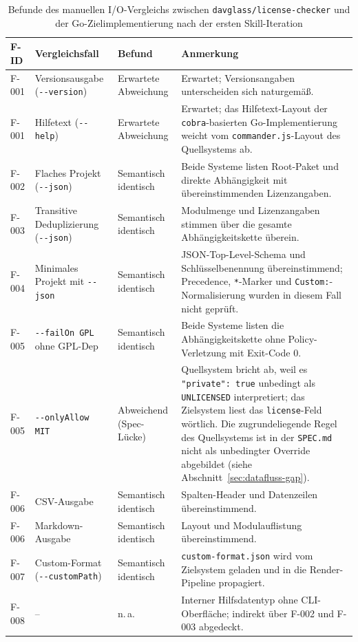\begin{table}[H]
\centering
\begin{small}
\begin{tabular}{|p{1.3cm}|p{3.5cm}|p{2.6cm}|p{5.5cm}|}
\hline
\textbf{F-ID} & \textbf{Vergleichsfall} & \textbf{Befund} & \textbf{Anmerkung} \\
\hline
F-001 & Versionsausgabe (\texttt{-{}-version}) & Erwartete Abweichung & Erwartet; Versionsangaben unterscheiden sich naturgemäß. \\
\hline
F-001 & Hilfetext (\texttt{-{}-help}) & Erwartete Abweichung & Erwartet; das Hilfetext-Layout der \texttt{cobra}-basierten Go-Implementierung weicht vom \texttt{commander.js}-Layout des Quellsystems ab. \\
\hline
F-002 & Flaches Projekt (\texttt{-{}-json}) & Semantisch identisch & Beide Systeme listen Root-Paket und direkte Abhängigkeit mit übereinstimmenden Lizenzangaben. \\
\hline
F-003 & Transitive Deduplizierung (\texttt{-{}-json}) & Semantisch identisch & Modulmenge und Lizenzangaben stimmen über die gesamte Abhängigkeitskette überein. \\
\hline
F-004 & Minimales Projekt mit \texttt{-{}-json} & Semantisch identisch & JSON-Top-Level-Schema und Schlüsselbenennung übereinstimmend; Precedence, \texttt{*}-Marker und \texttt{Custom:}-Normalisierung wurden in diesem Fall nicht geprüft. \\
\hline
F-005 & \texttt{-{}-failOn GPL} ohne GPL-Dep & Semantisch identisch & Beide Systeme listen die Abhängigkeitskette ohne Policy-Verletzung mit Exit-Code $0$. \\
\hline
F-005 & \texttt{-{}-onlyAllow MIT} & Abweichend (Spec-Lücke) & Quellsystem bricht ab, weil es \texttt{"private": true} unbedingt als \texttt{UNLICENSED} interpretiert; das Zielsystem liest das \texttt{license}-Feld wörtlich. Die zugrundeliegende Regel des Quellsystems ist in der \texttt{SPEC.md} nicht als unbedingter Override abgebildet (siehe Abschnitt~\ref{sec:datafluss-gap}). \\
\hline
F-006 & CSV-Ausgabe & Semantisch identisch & Spalten-Header und Datenzeilen übereinstimmend. \\
\hline
F-006 & Markdown-Ausgabe & Semantisch identisch & Layout und Modulauflistung übereinstimmend. \\
\hline
F-007 & Custom-Format (\texttt{-{}-customPath}) & Semantisch identisch & \texttt{custom-format.json} wird vom Zielsystem geladen und in die Render-Pipeline propagiert. \\
\hline
F-008 & -- & n.\,a. & Interner Hilfsdatentyp ohne CLI-Oberfläche; indirekt über F-002 und F-003 abgedeckt. \\
\hline
\end{tabular}
\end{small}
\caption{Befunde des manuellen I/O-Vergleichs zwischen \texttt{davglass/license-checker} und der Go-Zielimplementierung nach der ersten Skill-Iteration}
\label{tab:io-befunde}
\end{table}

